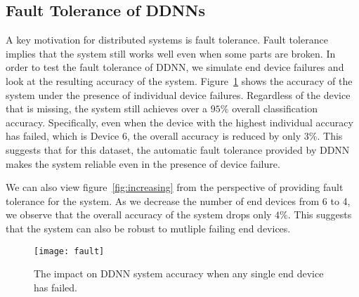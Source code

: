 \documentclass[10pt, conference, compsocconf]{IEEEtran}
\begin{document}

\subsection{Fault Tolerance of DDNNs}
A key motivation for distributed systems is fault tolerance. Fault tolerance implies that the system still works well even when some parts are broken. In order to test the fault tolerance of DDNN, we simulate end device failures and look at the resulting accuracy of the system. Figure~\ref{fig:fault} shows the accuracy of the system under the presence of individual device failures. Regardless of the device that is missing, the system still achieves over a $95\%$ overall classification accuracy. Specifically, even when the device with the highest individual accuracy has failed, which is Device 6, the overall accuracy is reduced by only $3\%$. This suggests that for this dataset, the automatic fault tolerance provided by DDNN makes the system reliable even in the presence of device failure.

We can also view figure~\ref{fig:increasing} from the perspective of providing fault tolerance for the system. As we decrease the number of end devices from 6 to 4, we observe that the overall accuracy of the system drops only $4\%$. This suggests that the system can also be robust to mutliple failing end devices.

\begin{figure}
    \centering
    \texttt{[image: fault]}
    \caption{The impact on DDNN system accuracy when any single end device has failed.}
    \label{fig:fault}
\end{figure}
\end{document}
